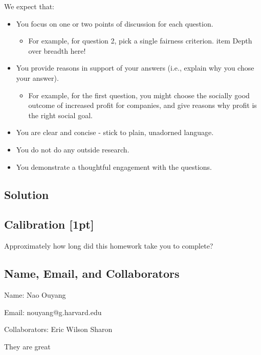 \documentclass[submit]{harvardml}
\newenvironment{answer}{%
    \color{answergreen}\bf}
  {%
  }
\begin{document}
\begin{problem}
We expect that:
\begin{itemize}
\item You focus on one or two points of discussion for each question. 
\begin{itemize}
\item For example, for question 2, pick a single fairness criterion. 
item Depth over breadth here! 
\end{itemize}
\item You provide reasons in support of your answers (i.e., explain why you chose your answer).
\begin{itemize}
\item For example, for the first question, you might choose the socially good outcome of increased profit for companies, and give reasons why profit is the right social goal.
\end{itemize}
\item You are clear and concise - stick to plain, unadorned language.  
\item You do not do any outside research. 
\item You demonstrate a thoughtful engagement with the questions. 
\end{itemize}


\end{problem}

\subsection*{Solution}
    \begin{answer}

    \end{answer}
\newpage

\subsection*{Calibration [1pt]}
Approximately how long did this homework take you to complete?

\subsection*{Name, Email, and Collaborators}

Name: Nao Ouyang

Email: nouyang@g.harvard.edu    

Collaborators:
Eric
Wilson
Sharon

They are great
\end{document}
